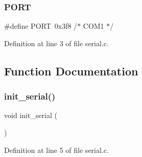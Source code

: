 \subsubsection{\texorpdfstring{P\+O\+RT}{PORT}}
{\footnotesize\ttfamily \#define P\+O\+RT~0x3f8   /$\ast$ C\+O\+M1 $\ast$/}



Definition at line 3 of file serial.\+c.



\subsection{Function Documentation}
\mbox{\label{a00050_acfb6f6d615183fc2f71e79dfbadfe27d_acfb6f6d615183fc2f71e79dfbadfe27d}} 
\subsubsection{\texorpdfstring{init\+\_\+serial()}{init\_serial()}}
{\footnotesize\ttfamily void init\+\_\+serial (\begin{DoxyParamCaption}{ }\end{DoxyParamCaption})}



Definition at line 5 of file serial.\+c.


